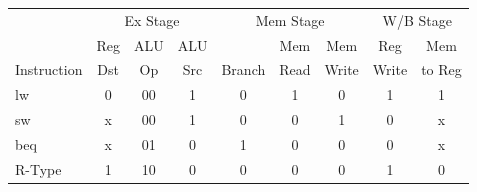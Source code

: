 \vspace{.1in}\noindent
\begin{tabular}{|l|ccc|ccc|cc|}\hline
&\multicolumn{3}{|c|}{Ex Stage} &\multicolumn{3}{|c|}{Mem Stage} & \multicolumn{2}{|c|}{W/B Stage} \\\cline{2-9}
            & Reg & ALU & ALU &        & Mem  & Mem   & Reg   & Mem    \\
Instruction & Dst & Op  & Src & Branch & Read & Write & Write & to Reg \\\hline
lw          & 0   & 00  & 1   & 0      & 1    & 0     & 1     & 1      \\
sw          & x   & 00  & 1   & 0      & 0    & 1     & 0     & x      \\\hline
beq         & x   & 01  & 0   & 1      & 0    & 0     & 0     & x      \\
R-Type      & 1   & 10  & 0   & 0      & 0    & 0     & 1     & 0      \\\hline
\end{tabular}
